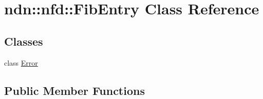 \hypertarget{classndn_1_1nfd_1_1FibEntry}{}\section{ndn\+:\+:nfd\+:\+:Fib\+Entry Class Reference}
\label{classndn_1_1nfd_1_1FibEntry}
\subsection*{Classes}
\begin{DoxyCompactItemize}
\item 
class \hyperlink{classndn_1_1nfd_1_1FibEntry_1_1Error}{Error}
\end{DoxyCompactItemize}
\subsection*{Public Member Functions}
